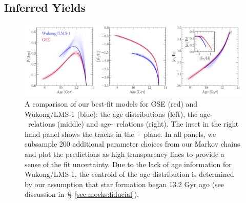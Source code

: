 \documentclass[foo.tex]{subfiles}
\begin{document}
{\color{red}
\subsection{Inferred Yields}
\label{sec:h3:yields}

\begin{figure}
\centering
\includegraphics[scale = 0.45]{gse_wukong_comparison.pdf}
\caption{
A comparison of our best-fit models for GSE (red) and Wukong/LMS-1 (blue): the
age distributions (left), the age-\feh~relations (middle) and age-\afe~relations
(right).
The inset in the right hand panel shows the tracks in the~\afe-\feh~plane.
In all panels, we subsample 200 additional parameter choices from our Markov
chains and plot the predictions as high transparency lines to provide a sense
of the fit uncertainty.
Due to the lack of age information for Wukong/LMS-1, the centroid of the age
distribution is determined by our assumption that star formation began 13.2
Gyr ago (see discussion in~\S~\ref{sec:mocks:fiducial}).
}
\label{fig:comparison}
\end{figure}

}
\end{document}
